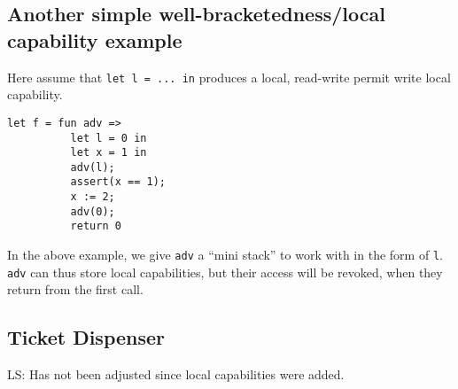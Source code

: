 \documentclass[a4paper]{article}
\newcommand\lau[1]{{\color{purple} \sf \footnotesize {LS: #1}}\\}
\newcommand{\var}[1]{\mathit{#1}}
\newcommand{\hs}{\var{hs}}
\newcommand{\codelabel}[1]{\mathit{#1}}
\newcommand{\malloc}{\codelabel{malloc}}
\begin{document}
\subsection{Another simple well-bracketedness/local capability example}
Here assume that \texttt{let l = ... in} produces a local, read-write permit write local capability.
\begin{verbatim}
let f = fun adv =>
          let l = 0 in
          let x = 1 in
          adv(l);
          assert(x == 1);
          x := 2;
          adv(0);
          return 0
\end{verbatim}
In the above example, we give \texttt{adv} a ``mini stack'' to work with in the form of \texttt{l}. \texttt{adv} can thus store local capabilities, but their access will be revoked, when they return from the first call.

\subsection{Ticket Dispenser}
\label{sec:tick-disp}
\newcommand{\hsfoot}{\hs_\var{footprint}}
\newcommand{\hsframe}{\hs_\var{frame}}
\newcommand{\size}{\var{size}}
\newcommand{\rio}{r_{io}}
\newcommand{\adv}{\codelabel{adv}}
\newcommand{\advb}{\var{adv_{base}}}
\newcommand{\adve}{\var{adv_{end}}}
\newcommand{\initb}{\var{init}_{base}}
\newcommand{\inite}{\var{init}_{end}}
\newcommand{\mrlen}{5cm}
\newcommand{\retm}{\var{ret}_{\malloc}}
\newcommand{\reta}{\var{ret}_{\adv}}
\newcommand{\base}{\var{base}}
\newcommand{\eend}{\var{end}}
\newcommand{\bracket}[1]{\multirow{#1}{*}{\ensuremath{
 \left . \vphantom{\begin{array}{l}
 \ifthenelse{\equal{#1}{1}}{3\\}{
    \ifthenelse{\equal{#1}{2}}{3\\3\\}{
    \ifthenelse{\equal{#1}{3}}{3\\3\\3\\}{
    \ifthenelse{\equal{#1}{4}}{3\\3\\3\\3\\}{
    \ifthenelse{\equal{#1}{5}}{3\\3\\3\\3\\3\\}{
    \ifthenelse{\equal{#1}{6}}{3\\3\\3\\3\\3\\3\\}{
      3\\3\\3\\3\\3\\3\\3\\ %
  }}}}}}
  \end{array}} \right \}}}
}
\newcommand{\annotate}[2]{\multirow{#1}{\mrlen}{\scriptsize #2}}
\lau{Has not been adjusted since local capabilities were added.}
\end{document}
